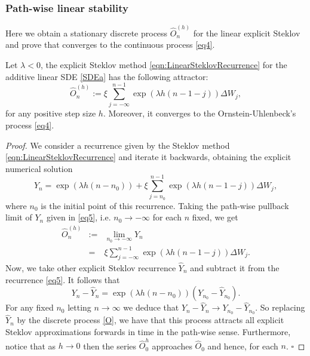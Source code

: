 	\subsubsection{Path-wise linear stability}
		Here we obtain a stationary discrete process $\widehat{O}_n^{(h)}$ for the linear explicit
		Steklov  and  prove that converges to the continuous process \eqref{eq4}. 
	\begin{pro}
		Let $\lambda<0$, the explicit Steklov method \eqref{eqn:LinearSteklovRecurrence} for
		the additive linear SDE \eqref{SDEa} has the following attractor: 
		\begin{equation}\label{O}
			\widehat{O}_n^{(h)}  :=
			\xi \sum_{j=-\infty}^{n-1}\exp(\lambda h(n-1-j)) \Delta W_j,
		\end{equation}
		for any positive step size $h$. Moreover, it converges to the Ornstein-Uhlenbeck's
		process \eqref{eq4}.
	\end{pro}
	\begin{proof}
		We consider a recurrence given  by the Steklov method
		\eqref{eqn:LinearSteklovRecurrence} and iterate it backwards, obtaining the explicit
		numerical solution
		\begin{equation}
		Y_n= \exp(\lambda h(n-n_0))+\xi\sum_{j=n_0}^{n-1}
		\exp(\lambda h(n-1-j))\Delta W_j, \label{eq5}
		\end{equation}
		where $n_0$ is the initial point of this recurrence. Taking the path-wise pullback
		limit of $Y_n$ given in \eqref{eq5}, i.e. $n_0\to -\infty$ for each $n$ fixed, we get
		\begin{eqnarray}
		\widehat{O}_n^{(h)}  &:=&  \lim_{n_0 \to -\infty} Y_n
		\nonumber  \\
		&=& \xi \sum_{j=-\infty}^{n-1}\exp(\lambda h(n-1-j)) \Delta W_j.
		\nonumber
		\end{eqnarray}
		Now, we take other explicit Steklov recurrence $\widehat{Y}_n$ and subtract it from
		the recurrence \eqref{eq5}. It follows that
		$$
		Y_n-\widehat{Y}_n=\exp(\lambda h(n-n_0))(Y_{n_0}-
		\widehat{Y}_{n_0}).
		$$
		For any fixed $n_0$ letting $n\to \infty$ we deduce that
		$Y_n-\widehat{Y}_n\to Y_{n_0}-\widehat{Y}_{n_0}$. So replacing $\widehat{Y}_n$ by the
		discrete process \eqref{O}, we have that this process attracts all explicit Steklov
		approximations forwards in time in the path-wise sense. Furthermore, notice that as
		$h\to 0$ then  the series $\widehat{O}^{h}_0$ approaches $\widehat{O}_0$ and hence,
		for each $n$. $\square$
	\end{proof}
